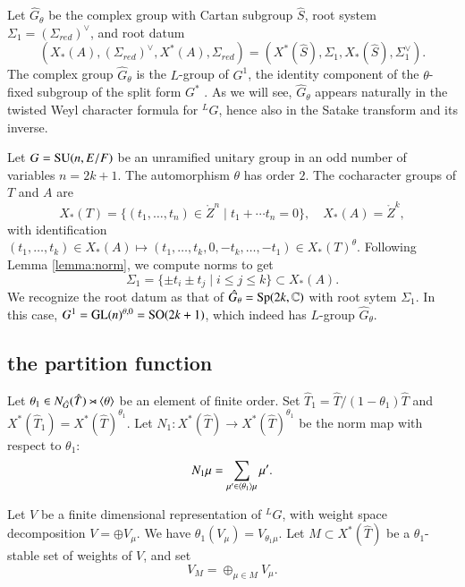 Let $\hat G_\theta$ be the complex group with Cartan subgroup $\hat
S$, root system $\Sigma_1=(\Sigma_{red})^\vee$, and root datum
\[
(X_*(A),(\Sigma_{red})^\vee,X^*(A),\Sigma_{red}) 
= (X^*(\hat S),\Sigma_1,X_*(\hat S),\Sigma_1^\vee).
\]
The complex group $\hat G_\theta$ is the $L$-group of $G^1$, the
identity component of the $\theta$-fixed subgroup of the split form
$G^*$ \cite[\S1.3]{kottwitz1999foundations}.  As we will see, $\hat
G_\theta$ appears naturally in the twisted Weyl character formula for
${}^LG$, hence also in the Satake transform and its inverse.

\begin{example} Let $G={\operatorname{SU}}(n,E/F)$ be an unramified unitary group
  in an odd number of variables $n=2k+1$.  The automorphism $\theta$
  has order $2$.  The cocharacter groups of $T$ and $A$ are
\[
X_*(T) = \{(t_1,\ldots,t_{n})\in \ring{Z}^n\mid t_1+\cdots t_n=0\}, 
\quad
X_*(A)  = \ring{Z}^k,
\]
with identification $(t_1,\ldots,t_k)\in X_*(A)\mapsto
(t_1,\ldots,t_k,0,-t_k,\ldots,-t_1)\in X_*(T)^\theta$.  Following
Lemma \ref{lemma:norm}, we compute norms to get
\[
\Sigma_1 = \{\pm t_i\pm t_j\mid i\le j\le k\}\subset X_*(A).
\]
We recognize the root datum as that of $\hat G_\theta =
{\operatorname{Sp}}(2k,\mathbb{C})$ with root sytem $\Sigma_1$.  In this case, $G^1
= {\operatorname{GL}}(n)^{\theta,0} = {\operatorname{SO}}(2k+1)$, which indeed has $L$-group
$\hat G_\theta$.
\end{example}


\subsection{the partition function}

Let $\theta_1\in N_{\hat G}(\hat T) \rtimes \langle{\theta}\rangle$ be an
element of finite order.  Set $\hat T_1 = \hat T/(1-\theta_1)\hat T$
and $X^*(\hat T_1) = X^*(\hat T)^{\theta_1}$.  Let $N_1:X^*(\hat T)\to
X^*(\hat T)^{\theta_1}$ be the norm map with respect to $\theta_1$:
\[
N_1 \mu = \sum_{\mu'\in \langle{\theta_1}\rangle\mu} \mu'.
\]

Let $V$ be a finite dimensional representation of ${}^LG$, with
weight space decomposition 
$V=\oplus V_\mu$.  We have
$\theta_1(V_\mu) = V_{\theta_1\mu}$.  Let $M\subset X^*(\hat T)$ be a
$\theta_1$-stable set of weights of $V$, and set
\begin{equation}\label{eqn:VM}
V_M = \oplus_{\mu\in M} V_\mu.
\end{equation}

